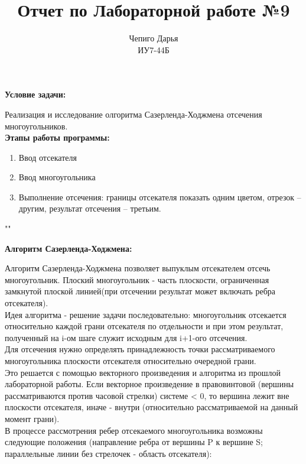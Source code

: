 \documentclass[a4paper,12pt]{article}
\title{Отчет по Лабораторной работе №9\\[150mm]}
\author{Чепиго Дарья \\ИУ7-44Б}
\date{}
\begin{document}
	\begin{titlepage}
		\maketitle
		\thispagestyle{empty}
	\end{titlepage}
	
	\newpage
	\noindent\textbf{Условие задачи:}
	
	Реализация и исследование олгоритма Сазерленда-Ходжмена отсечения многоугольников.\\
	
	\noindent\textbf{Этапы работы программы:}
	\begin{enumerate} 
		\item Ввод отсекателя
		\item Ввод многоугольника
		\item Выполнение отсечения: границы отсекателя показать одним цветом, отрезок -- другим, результат отсечения -- третьим.
	\end{enumerate}
	""

	\noindent\textbf{Алгоритм Сазерленда-Ходжмена:}

	Алгоритм Сазерленда-Ходжмена позволяет выпуклым отсекателем отсечь многоугольник. Плоский многоугольник - часть плоскости, ограниченная замкнутой плоской линией(при отсечении результат может включать ребра отсекателя).\\
	
	Идея алгоритма - решение задачи последовательно: многоугольник отсекается относительно каждой грани отсекателя по отдельности и при этом результат, полученный на i-ом шаге служит исходным для i+1-ого отсечения.\\
	
	
	Для отсечения нужно определять принадлежность точки рассматриваемого многоугольника плоскости отсекателя относительно очередной грани.\\

	Это решается с помощью векторного произведения и алгоритма из прошлой лабораторной работы. Если векторное произведение в правовинтовой (вершины рассматриваются против часовой стрелки) системе < 0, то вершина лежит вне плоскости отсекателя, иначе - внутри (относительно рассматриваемой на данный момент грани).\\
	\newpage
	В процессе рассмотрения ребер отсекаемого многоугольника возможны следующие положения (направление ребра от вершины P к вершине S; параллельные линии без стрелочек - область отсекателя):\\
	
\end{document}
